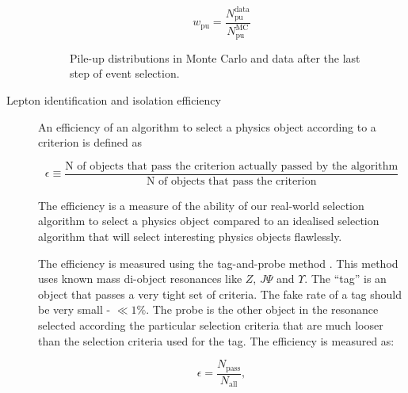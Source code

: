 \begin{description}
\begin{equation}
w_{\text{pu}}=\frac{N^{\text{data}}_{\text{pu}}}{N^{\text{MC}}_{\text{pu}}}
\end{equation}

\begin{figure}[htp]
\centering
  \def\twidth{0.45}
  \centering
\caption{Pile-up distributions in Monte Carlo and data after the last step of event selection. }
\label{fig:L4_1l4j2b2w_nvtx}
\end{figure}


\item[Lepton identification and isolation efficiency]

An efficiency of an algorithm to select a physics object according to a criterion is defined as 

\begin{equation}
\epsilon\equiv\frac{\text{N of objects that pass the criterion actually passed by the algorithm}}{\text{N of objects that pass the criterion}}
\end{equation}

The efficiency is a measure of the ability of our real-world selection algorithm to select a physics object compared to an idealised selection algorithm that will select interesting physics objects flawlessly.

The efficiency is measured using the tag-and-probe method \cite{CMS-AN-2009-111}. This method uses known mass di-object resonances like $Z$, $J\Psi$ and $\Upsilon$. The ``tag'' is an object that passes a very tight set of criteria. The fake rate of a tag should be very small - $\ll 1\%$. The probe is the other object in the resonance selected according the particular selection criteria that are much looser than the selection criteria used for the tag. The efficiency is measured as:

\begin{equation}
\epsilon=\frac{N_{\text{pass}}}{N_{\text{all}}},
\end{equation}


\end{description}
